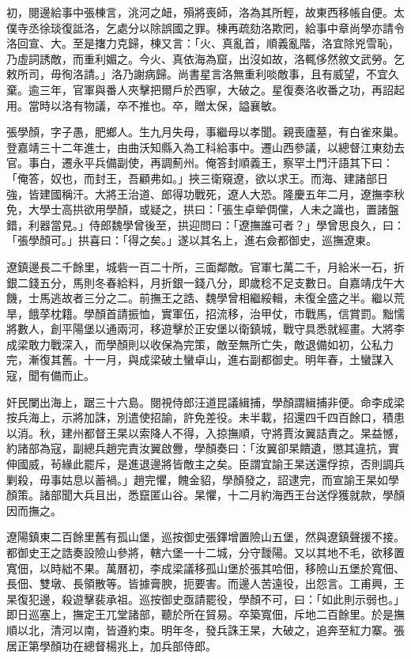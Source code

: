 \begin{pinyinscope}
初，閱邊給事中張棟言，洮河之衄，殞將喪師，洛為其所輕，故東西移帳自便。太僕寺丞徐琰復詆洛，乞處分以除誤國之罪。棟再疏劾洛欺罔，給事中章尚學亦請令洛回宣、大。至是撦力克歸，棟又言：「火、真亂首，順義亂階，洛宜除兇雪恥，乃虛詞誘敵，而重利媚之。今火、真依海為窟，出沒如故，洛輒侈然敘文武勞。乞敕所司，毋徇洛請。」洛乃謝病歸。尚書星言洛無重利啖敵事，且有威望，不宜久棄。逾三年，官軍與番人夾擊把爾戶於西寧，大破之。星復奏洛收番之功，再詔起用。當時以洛有物議，卒不推也。卒，贈太保，謚襄敏。

張學顏，字子愚，肥鄉人。生九月失母，事繼母以孝聞。親喪廬墓，有白雀來巢。登嘉靖三十二年進士，由曲沃知縣入為工科給事中。遷山西參議，以總督江東劾去官。事白，遷永平兵備副使，再調薊州。俺答封順義王，察罕土門汗語其下曰：「俺答，奴也，而封王，吾顧弗如。」挾三衛窺遼，欲以求王。而海、建諸部日強，皆建國稱汗。大將王治道、郎得功戰死，遼人大恐。隆慶五年二月，遼撫李秋免，大學士高拱欲用學顏，或疑之，拱曰：「張生卓犖倜儻，人未之識也，置諸盤錯，利器當見。」侍郎魏學曾後至，拱迎問曰：「遼撫誰可者？」學曾思良久，曰：「張學顏可。」拱喜曰：「得之矣。」遂以其名上，進右僉都御史，巡撫遼東。

遼鎮邊長二千餘里，城砦一百二十所，三面鄰敵。官軍七萬二千，月給米一石，折銀二錢五分，馬則冬春給料，月折銀一錢八分，即歲稔不足支數日。自嘉靖戊午大饑，士馬逃故者三分之二。前撫王之誥、魏學曾相繼綏輯，未復全盛之半。繼以荒旱，餓莩枕籍。學顏首請振恤，實軍伍，招流移，治甲仗，市戰馬，信賞罰。黜懦將數人，創平陽堡以通兩河，移遊擊於正安堡以衛鎮城，戰守具悉就經畫。大將李成梁敢力戰深入，而學顏則以收保為完策，敵至無所亡失，敵退備如初，公私力完，漸復其舊。十一月，與成梁破土蠻卓山，進右副都御史。明年春，土蠻謀入寇，聞有備而止。

奸民闌出海上，踞三十六島。閱視侍郎汪道昆議緝捕，學顏謂緝捕非便。命李成梁按兵海上，示將加誅，別遣使招諭，許免差役。未半載，招還四千四百餘口，積患以消。秋，建州都督王杲以索降人不得，入掠撫順，守將賈汝翼詰責之。杲益憾，約諸部為寇，副總兵趙完責汝翼啟釁，學顏奏曰：「汝翼卻杲饋遺，懲其違抗，實伸國威，茍緣此罷斥，是進退邊將皆敵主之矣。臣謂宜諭王杲送還俘掠，否則調兵剿殺，毋事姑息以蓄禍。」趙完懼，餽金貂，學顏發之，詔逮完，而宣諭王杲如學顏策。諸部聞大兵且出，悉竄匿山谷。杲懼，十二月約海西王台送俘獲就款，學顏因而撫之。

遼陽鎮東二百餘里舊有孤山堡，巡按御史張鐸增置險山五堡，然與遼鎮聲援不接。都御史王之誥奏設險山參將，轄六堡一十二城，分守靉陽。又以其地不毛，欲移置寬佃，以時絀不果。萬曆初，李成梁議移孤山堡於張其哈佃，移險山五堡於寬佃、長佃、雙墩、長領散等。皆據膏腴，扼要害。而邊人苦遠役，出怨言。工甫興，王杲復犯邊，殺遊擊裴承祖。巡按御史亟請罷役，學顏不可，曰：「如此則示弱也。」即日巡塞上，撫定王兀堂諸部，聽於所在貿易。卒築寬佃，斥地二百餘里。於是撫順以北，清河以南，皆遵約束。明年冬，發兵誅王杲，大破之，追奔至紅力寨。張居正第學顏功在總督楊兆上，加兵部侍郎。


\end{pinyinscope}
